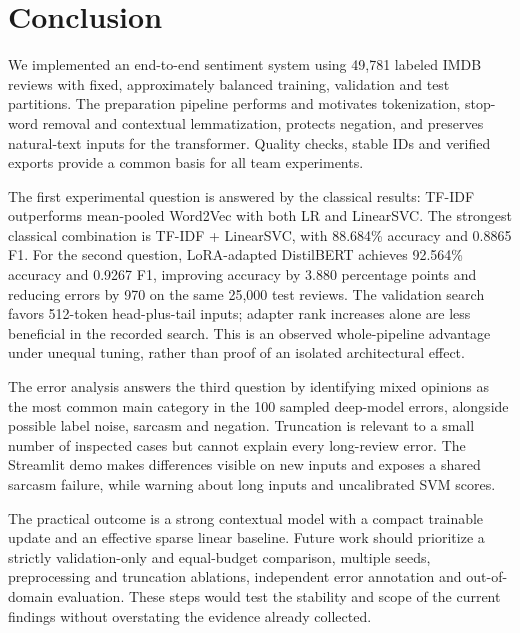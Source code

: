 \section{Conclusion}\label{sec:conclusion}
We implemented an end-to-end sentiment system using 49,781 labeled IMDB reviews
with fixed, approximately balanced training, validation and test partitions.
The preparation pipeline performs and motivates tokenization, stop-word removal
and contextual lemmatization, protects negation, and preserves natural-text
inputs for the transformer. Quality checks, stable IDs and verified exports
provide a common basis for all team experiments.

The first experimental question is answered by the classical results: TF-IDF
outperforms mean-pooled Word2Vec with both LR and LinearSVC. The strongest
classical combination is TF-IDF + LinearSVC, with 88.684\% accuracy and 0.8865
F1. For the second question, LoRA-adapted DistilBERT achieves 92.564\% accuracy
and 0.9267 F1, improving accuracy by 3.880 percentage points and reducing errors
by 970 on the same 25,000 test reviews. The validation search favors 512-token
head-plus-tail inputs; adapter rank increases alone are less beneficial in the
recorded search. This is an observed whole-pipeline advantage under unequal
tuning, rather than proof of an isolated architectural effect.

The error analysis answers the third question by identifying mixed opinions
as the most common main category in the 100 sampled deep-model errors, alongside
possible label noise, sarcasm and negation. Truncation is relevant to a small
number of inspected cases but cannot explain every long-review error. The
Streamlit demo makes differences visible on new inputs and exposes a shared
sarcasm failure, while warning about long inputs and uncalibrated SVM scores.

The practical outcome is a strong contextual model with a compact trainable
update and an effective sparse linear baseline. Future work should prioritize
a strictly validation-only and equal-budget comparison, multiple seeds,
preprocessing and truncation ablations, independent error annotation and
out-of-domain evaluation. These steps would test the stability and scope of
the current findings without overstating the evidence already collected.
